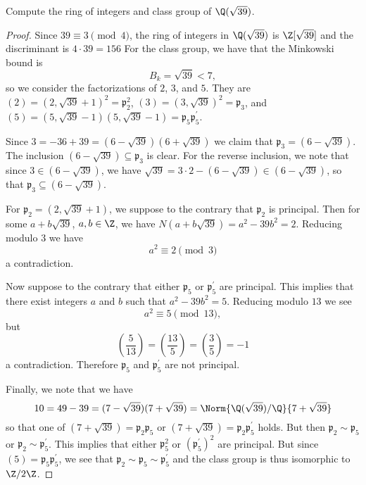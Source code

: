 \documentclass[10pt]{amsart}
\begin{document}
\begin{thm}\label{Ex4}
	Compute the ring of integers and class group of $\Q(\sqrt{39})$.
	\begin{proof}
		Since $39 \equiv 3 \pmod{4}$, the ring of integers in $\Q(\sqrt{39})$ is $\Z[\sqrt{39}]$ and the discriminant is $4\cdot39 = 156$
		For the class group, we have that the Minkowski bound is
		$$B_k = \sqrt{39} < 7,$$
		so we consider the factorizations of $2$, $3$, and $5$.
		They are
		$(2) = (2, \sqrt{39} + 1)^2 = \mathfrak{p}_2^2$,
		$(3) = (3, \sqrt{39})^2 = \mathfrak{p}_3$, and
		$(5) = (5, \sqrt{39} - 1)(5, \sqrt{39} - 1) = \mathfrak{p}_5\mathfrak{p}_5^\prime$.
	
		Since $3 = -36 + 39 = (6 - \sqrt{39})(6 + \sqrt{39})$ we claim that $\mathfrak{p}_3 = (6 - \sqrt{39})$.
		The inclusion $(6 - \sqrt{39}) \subseteq \mathfrak{p}_3$ is clear.
		For the reverse inclusion, we note that since $3 \in (6 - \sqrt{39})$, we have $\sqrt{39} = 3\cdot2 - (6 - \sqrt{39}) \in (6 - \sqrt{39})$, so that $\mathfrak{p}_3 \subseteq (6 - \sqrt{39})$.
	
		For $\mathfrak{p}_2 = (2, \sqrt{39} + 1)$, we suppose to the contrary that $\mathfrak{p}_2$ is principal.
		Then for some $a + b\sqrt{39}$, $a, b \in \Z$, we have $N(a + b\sqrt{39}) = a^2 - 39b^2 = 2$.
		Reducing modulo $3$ we have
		$$a^2 \equiv 2 \pmod{3}$$
		a contradiction.

		Now suppose to the contrary that either $\mathfrak{p}_5$ or $\mathfrak{p}_5^\prime$ are principal.
		This implies that there exist integers $a$ and $b$ such that $a^2 - 39b^2 = 5$.
		Reducing modulo $13$ we see
		$$a^2 \equiv 5 \pmod{13},$$
		but
		$$\left(\frac{5}{13}\right) = \left(\frac{13}{5}\right) = \left(\frac{3}{5}\right) = -1$$
		a contradiction.
		Therefore $\mathfrak{p}_5$ and $\mathfrak{p}_5^\prime$ are not principal.

		Finally, we note that we have
		$$10 = 49 - 39 = (7 - \sqrt{39})(7 + \sqrt{39}) = \Norm{\Q(\sqrt{39})/\Q}{7 + \sqrt{39}}$$
		so that one of $(7 + \sqrt{39}) = \mathfrak{p}_2\mathfrak{p}_5$ or $(7 + \sqrt{39}) = \mathfrak{p}_2\mathfrak{p}_5^\prime$ holds.
		But then $\mathfrak{p}_2 \sim \mathfrak{p}_5$ or $\mathfrak{p}_2 \sim \mathfrak{p}_5^\prime$.
		This implies that either $\mathfrak{p}_5^2$ or $(\mathfrak{p}_5^\prime)^2$ are principal.	
		But since $(5) = \mathfrak{p}_5\mathfrak{p}_5^\prime$, we see that $\mathfrak{p}_2 \sim \mathfrak{p}_5 \sim \mathfrak{p}_5^\prime$ and the class group is thus isomorphic to $\Z/2\Z$.
	\end{proof}
\end{thm}
\end{document}
